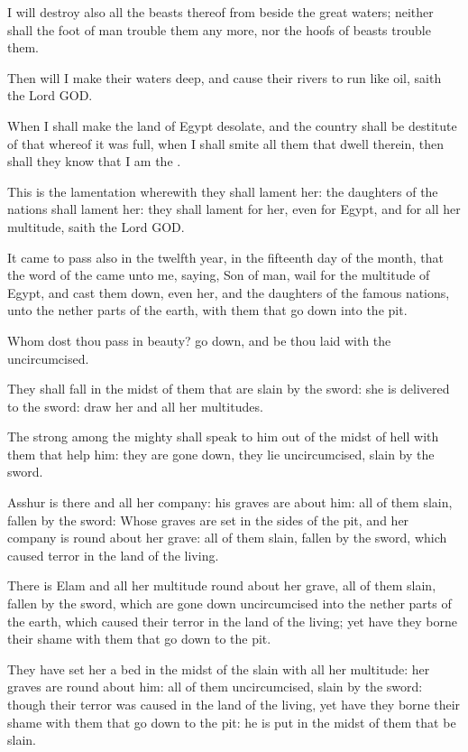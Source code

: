 \Verse I will destroy also all the beasts thereof from beside the great waters; neither shall the foot of man trouble them any more, nor the hoofs of beasts trouble them.

\Verse Then will I make their waters deep, and cause their rivers to run like oil, saith the Lord GOD.

\Verse When I shall make the land of Egypt desolate, and the country shall be destitute of that whereof it was full, when I shall smite all them that dwell therein, then shall they know that I am the \LORD.

\Verse This is the lamentation wherewith they shall lament her: the daughters of the nations shall lament her: they shall lament for her, even for Egypt, and for all her multitude, saith the Lord GOD.

\Verse It came to pass also in the twelfth year, in the fifteenth day of the month, that the word of the \LORD came unto me, saying, \Verse Son of man, wail for the multitude of Egypt, and cast them down, even her, and the daughters of the famous nations, unto the nether parts of the earth, with them that go down into the pit.

\Verse Whom dost thou pass in beauty? go down, and be thou laid with the uncircumcised.

\Verse They shall fall in the midst of them that are slain by the sword: she is delivered to the sword: draw her and all her multitudes.

\Verse The strong among the mighty shall speak to him out of the midst of hell with them that help him: they are gone down, they lie uncircumcised, slain by the sword.

\Verse Asshur is there and all her company: his graves are about him: all of them slain, fallen by the sword: \Verse Whose graves are set in the sides of the pit, and her company is round about her grave: all of them slain, fallen by the sword, which caused terror in the land of the living.

\Verse There is Elam and all her multitude round about her grave, all of them slain, fallen by the sword, which are gone down uncircumcised into the nether parts of the earth, which caused their terror in the land of the living; yet have they borne their shame with them that go down to the pit.

\Verse They have set her a bed in the midst of the slain with all her multitude: her graves are round about him: all of them uncircumcised, slain by the sword: though their terror was caused in the land of the living, yet have they borne their shame with them that go down to the pit: he is put in the midst of them that be slain.

